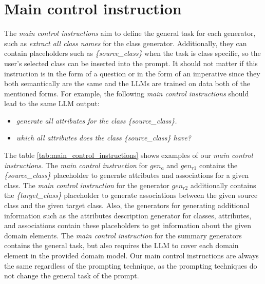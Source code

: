 \section{Main control instruction}

The \emph{main control instructions} aim to define the general task for each generator, such as \textit{extract all class names} for the class generator. Additionally, they can contain placeholders such as \textit{\{source\_class\}} when the task is class specific, so the user's selected class can be inserted into the prompt. It should not matter if this instruction is in the form of a question or in the form of an imperative since they both semantically are the same and the LLMs are trained on data both of the mentioned forms. For example, the following \emph{main control instructions} should lead to the same LLM output:

\begin{itemize}
\item \textit{generate all attributes for the class \{source\_class\}.}
\item \textit{which all attributes does the class \{source\_class\} have?}
\end{itemize}

The table \ref{tab:main_control_instructions} shows examples of our \emph{main control instructions}. The \emph{main control instruction} for $gen_a$ and $gen_{r1}$ contains the \textit{\{source\_class\}} placeholder to generate attributes and associations for a given class. The \emph{main control instruction} for the generator $gen_{r2}$ additionally contains the \textit{\{target\_class\}} placeholder to generate associations between the given source class and the given target class. Also, the generators for generating additional information such as the attributes description generator for classes, attributes, and associations contain these placeholders to get information about the given domain elements. The \emph{main control instruction} for the summary generators contains the general task, but also requires the LLM to cover each domain element in the provided domain model.
Our main control instructions are always the same regardless of the prompting technique, as the prompting techniques do not change the general task of the prompt.


